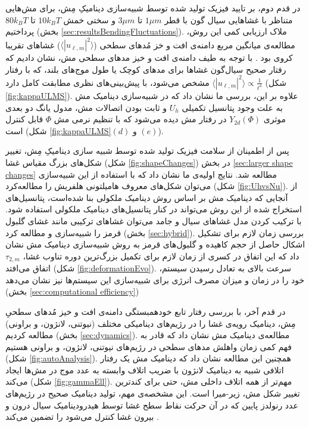 در قدم دوم، بر تایید فیزیک تولید شده  توسط شبیه‌سازی دینامیکِ مِش، برای مش‌هایی متناظر با غشاهایی سیال گون با قطر 
$1 \mu m$
تا
$3 \mu m$
و سختی خمش 
$10 k_BT$
تا
$80 k_BT$
پرداختیم (بخش
\ref{sec:resultsBendingFluctuations}).
ملاک ارزیابی کمی این روش، مطالعه‌ی میانگین مربع دامنه‌ی افت و خز مُد‌های سطحی
($\langle|u_{\ell,m}|^2\rangle$)
 غشا‌های تقریبا کروی بود
\cite{milnersafranPRA1987, gomppernelson2012}.
با توجه به طیف دامنه‌ی افت و خیز مد‌های سطحی مش، نشان دادیم که رفتار صحیح سیال‌گون غشا‌ها برای مد‌های کوچک یا طول موج‌های بلند، که با رفتار 
 $\langle|u_{\ell,m}|^2\rangle\propto \frac{1}{\ell^4}$
مشخص می‌شود، با پیش‌بینی‌های نظری مطابقت کامل دارد (شکل
\ref{fig:kappaULMS}).
 علاوه بر این، بررسی ما نشان داد که در شبیه‌سازی دینامیک مش به علت وجود پتانسیل تکمیلی
$U_h$
و ثابت بودن اتصالات مش، مدول یانگ دو بعدی موثری 
$Y_{2d}(\Phi)$
در رفتار مش دیده‌ می‌شود که با تنظیم نرمی مش
 $\Phi$ 
قابل کنترل است (شکل
\ref{fig:kappaULMS}$(d)$
و
$(e)$).

پس از اطمینان از سلامت فیزیک تولید شده توسط شبیه‌ سازی دینامیکِ مِش، تغییر شکل‌های بزرگ مقیاس غشا (شکل
\ref{fig:shapeChanges})
در بخش 
\ref{sec:larger shape changes}
مطالعه‌ شد. نتایج اولیه‌ی ما نشان داد که با استفاده از این شبیه‌سازی می‌توان شکل‌های معروف هامیلتونی هلفریش را مطالعه‌کرد (شکل
\ref{fig:UhvsNu}).
از آنجایی که دینامیک مش بر اساس روش دینامیک ملکولی بنا شده‌است، پتانسیل‌های استخراج شده از این روش می‌تواند در کنار پتانسیل‌های دینامیک ملکولی استفاده شود. با ترکیب کردن مدل غشا‌های سیال و جامد می‌توان غشا‌های ترکیبی مانند غشای گلبول قرمز را شبیه‌سازی و مطالعه کرد (بخش 
\ref{sec:hybrid}).
بررسی زمان لازم برای تشکیل اشکال حاصل از حجم کاهیده و گلبول‌های قرمز به روش شبیه‌سازی دینامیک مش نشان داد که این اتفاق در کسری از  زمان لازم برای تکمیل بزرگ‌ترین دوره تناوب غشا،
$\tau_{2,m}$
اتفاق می‌افتد (شکل
\ref{fig:deformationEvo}).
 سرعت بالای به تعادل رسیدن سیستم، خود را در زمان و میزان مصرف انرژی برای  شبیه‌سازی‌ این سیستم‌ها نیز نشان می‌دهد (بخش 
\ref{sec:computational efficiency})

در قدم آخر،  با بررسی رفتار تابع خودهمبستگی دامنه‌ی افت و خیز‌ مُدهای سطحیِ مِش‌،  دینامیک رویه‌ی غشا را در رژیم‌های دینامیکی مختلف (نیوتنی، لانژون، و براونی) مطالعه کردیم (بخش
\ref{sec:dynamics}).
مطالعه‌ی دینامیک مش نشان داد که قادر به فهم کمی زمان واهلش مد‌های سطحی در رژیم‌های نیوتنی، لانژون، و براونی هستیم (شکل
\ref{fig:autoAnalysis}).
 همچنین این مطالعه نشان داد که دینامیک مش یک رفتار اتلافی شبیه‌ به دینامیک لانژون با ضریب اتلاف وابسته به عدد موج در مش‌ها ایجاد می‌کند (شکل
 \ref{fig:gammaEll}).
  مهم‌تر از همه اتلاف داخلی مش، حتی برای کند‌ترین تغییر شکل مش، زیر-میرا است. این مشخصه‌ی مهم، تولید دینامیک صحیح در رژیم‌های عدد رنولدز پایین که در آن حرکت نقاط سطح غشا توسط هیدرودینامیک سیال درون و بیرون غشا کنترل می‌شود را تضمین می‌کند
\cite{schneider1984,milnersafranPRA1987}.


